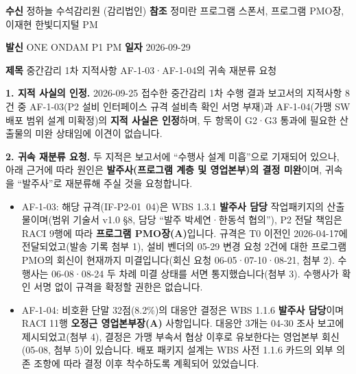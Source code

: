 \documentclass[10pt,a4paper]{article}
\begin{document}
\begin{fieldbox}\small
\ifwbblank
{} \hrulefill\quad {} \hrulefill\par
{} \hrulefill\quad {} \hrulefill\par
{} \hrulefill\par
{}
\par
\else
\textbf{수신} 정하늘 수석감리원 (감리법인) \quad \textbf{참조} 정미란 프로그램 스폰서, 프로그램 PMO장, 이재현 한빛디지털 PM\par
\textbf{발신} ONE ONDAM P1 PM \quad \textbf{일자} 2026-09-29\par
\textbf{제목} 중간감리 1차 지적사항 AF-1-03·AF-1-04의 귀속 재분류 요청\par
\textbf{1. 지적 사실의 인정.} 2026-09-25 접수한 중간감리 1차 수행 결과 보고서의 지적사항 8건 중 AF-1-03(P2 설비 인터페이스 규격 설비측 확인 서명 부재)과 AF-1-04(가맹 SW 배포 범위 설계 미확정)의 \textbf{지적 사실은 인정}하며, 두 항목이 G2·G3 통과에 필요한 산출물의 미완 상태임에 이견이 없습니다.\par
\textbf{2. 귀속 재분류 요청.} 두 지적은 보고서에 “수행사 설계 미흡”으로 기재되어 있으나, 아래 근거에 따라 원인은 \textbf{발주사(프로그램 계층 및 영업본부)의 결정 미완}이며, 귀속을 “발주사”로 재분류해 주실 것을 요청합니다.\par
\begin{itemize}
\item AF-1-03: 해당 규격(IF-P2-01~04)은 WBS 1.3.1 \textbf{발주사 담당} 작업패키지의 산출물이며(범위 기술서 v1.0 §8, 담당 “발주 박세연·한동석 협의”), P2 전달 책임은 RACI 9행에 따라 \textbf{프로그램 PMO장(A)}입니다. 규격은 T0 이전인 2026-04-17에 전달되었고(발송 기록 첨부 1), 설비 벤더의 05-29 변경 요청 2건에 대한 프로그램 PMO의 회신이 현재까지 미결입니다(회신 요청 06-05·07-10·08-21, 첨부 2). 수행사는 06-08·08-24 두 차례 미결 상태를 서면 통지했습니다(첨부 3). 수행사가 확인 서명 없이 규격을 확정할 권한은 없습니다.
\item AF-1-04: 비호환 단말 32점(8.2\%)의 대응안 결정은 WBS 1.1.6 \textbf{발주사 담당}이며 RACI 11행 \textbf{오정근 영업본부장(A)} 사항입니다. 대응안 3개는 04-30 조사 보고에 제시되었고(첨부 4), 결정은 가맹 부속서 협상 이후로 유보한다는 영업본부 회신(05-08, 첨부 5)이 있습니다. 배포 패키지 설계는 WBS 사전 1.1.6 카드의 외부 의존 조항에 따라 결정 이후 착수하도록 계획되어 있었습니다.

\end{itemize}
\end{fieldbox}
\end{document}
